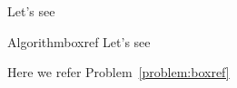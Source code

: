 \documentclass[11pt]{article}
\begin{document}
    \begin{problem}{}{}
    Let's see
    \end{problem}

    \begin{problem}{Algorithm}{boxref}
    Let's see
    \end{problem}
    Here we refer Problem~\ref{problem:boxref}%
\end{document}
